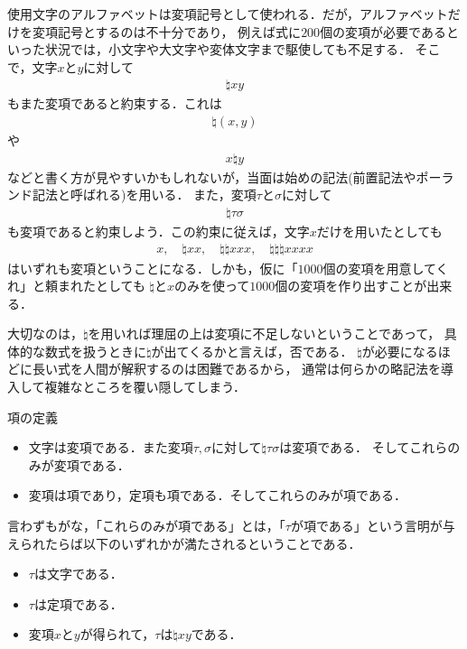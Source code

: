 \documentclass[a4j,10.5pt,oneside,openany]{jsbook}
\begin{document}
	使用文字のアルファベットは変項記号として使われる．だが，アルファベットだけを変項記号とするのは不十分であり，
	例えば式に$200$個の変項が必要であるといった状況では，小文字や大文字や変体文字まで駆使しても不足する．
	そこで，文字$x$と$y$に対して
	\begin{align}
		\natural xy
	\end{align}
	もまた変項であると約束する．これは
	\begin{align}
		\natural(x,y)
	\end{align}
	や
	\begin{align}
		x \natural y
	\end{align}
	などと書く方が見やすいかもしれないが，当面は始めの記法(前置記法やポーランド記法と呼ばれる)を用いる．
	また，変項$\tau$と$\sigma$に対して
	\begin{align}
		\natural \tau \sigma
	\end{align}
	も変項であると約束しよう．この約束に従えば，文字$x$だけを用いたとしても
	\begin{align}
		x,\quad \natural xx, \quad \natural \natural xxx, \quad \natural \natural \natural xxxx
	\end{align}
	はいずれも変項ということになる．しかも，仮に「$1000$個の変項を用意してくれ」と頼まれたとしても
	$\natural$と$x$のみを使って$1000$個の変項を作り出すことが出来る．
	
	大切なのは，$\natural$を用いれば理屈の上は変項に不足しないということであって，
	具体的な数式を扱うときに$\natural$が出てくるかと言えば，否である．
	$\natural$が必要になるほどに長い式を人間が解釈するのは困難であるから，
	通常は何らかの略記法を導入して複雑なところを覆い隠してしまう．

	\begin{itembox}[l]{項の定義}
		\begin{itemize}
			\item 文字は変項である．また変項$\tau,\sigma$に対して$\natural \tau \sigma$は変項である．
				そしてこれらのみが変項である．
				
			\item 変項は項であり，定項も項である．そしてこれらのみが項である．
		\end{itemize}
	\end{itembox}
	
	言わずもがな，「これらのみが項である」とは，「$\tau$が項である」という言明が与えられたらば以下のいずれかが満たされるということである．
	\begin{itemize}
		\item $\tau$は文字である．
		\item $\tau$は定項である．
		\item 変項$x$と$y$が得られて，$\tau$は$\natural xy$である．
	\end{itemize}
	
\end{document}
